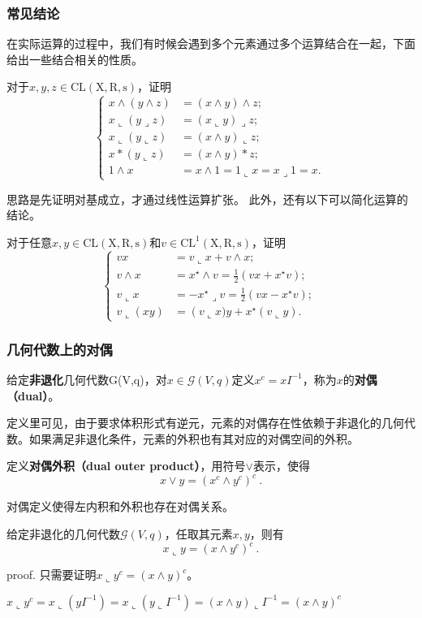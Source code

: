 \subsubsection{常见结论}
在实际运算的过程中，我们有时候会遇到多个元素通过多个运算结合在一起，下面给出一些结合相关的性质。
\begin{exercise}{}
对于$x,y,z\in\mathrm {CL(X,R,s)}$，证明
\begin{equation}
\left\{\begin{aligned}
x \wedge(y \wedge z) & =(x \wedge y) \wedge z ;\\
x\llcorner(y\lrcorner z) & =(x\llcorner y)\lrcorner z ;\\
x\llcorner(y\llcorner z) & =(x \wedge y)\llcorner z; \\
x *(y\llcorner z) & =(x \wedge y) * z ; \\
1 \wedge x & =x \wedge 1=1\llcorner x=x\lrcorner 1=x .
\end{aligned}\right.~
\end{equation}
\end{exercise}

思路是先证明对基成立，才通过线性运算扩张。
此外，还有以下可以简化运算的结论。
\begin{exercise}{}
对于任意$x,y\in\mathrm {CL(X,R,s)}$和$v\in \mathrm{CL^1(X,R,s)}$，证明
\begin{equation}
\left\{\begin{aligned}
v x&=v\llcorner x+v \wedge x ; \\
v \wedge x&=x^{\star} \wedge v=\frac{1}{2}\left(v x+x^{\star} v\right) ; \\
v\llcorner x&=-x^{\star}\lrcorner v=\frac{1}{2}\left(v x-x^{\star} v\right) ; \\
v\llcorner(x y)&=\left(v\llcorner x) y+x^{\star}(v\llcorner y) .\right.
\end{aligned}\right.~
\end{equation}
\end{exercise}
\subsubsection{几何代数上的对偶}
\begin{definition}{}
给定\textbf{非退化}几何代数\mathcal G(V,q)，对$x\in\mathcal G(V,q)$定义$x^c=xI^{-1}$，称为$x$的\textbf{对偶（dual）}。
\end{definition}
定义里可见，由于要求体积形式有逆元，元素的对偶存在性依赖于非退化的几何代数。如果满足非退化条件，元素的外积也有其对应的对偶空间的外积。
\begin{definition}{}
定义\textbf{对偶外积（dual outer product）}，用符号$\vee$表示，使得
\begin{equation}
x\vee y=(x^c\wedge y^c)^c~.
\end{equation}
\end{definition}
对偶定义使得左内积和外积也存在对偶关系。
\begin{theorem}{}\label{the_clf02_1}
给定非退化的几何代数$\mathcal G(V,q)$，任取其元素$x,y$，则有
\begin{equation}
x\llcorner y=(x\wedge y^c)^c~.
\end{equation}
\end{theorem}
proof.
只需要证明$x\llcorner y^c=(x\wedge y)^c$。

$x\llcorner y^c=x\llcorner (yI^{-1})=x\llcorner (y\llcorner I^{-1})=(x\wedge y)\llcorner I^{-1}=(x\wedge y)^c$